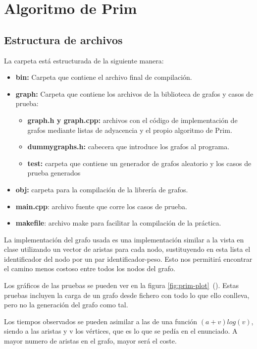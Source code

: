 \section{Algoritmo de Prim}
\subsection{Estructura de archivos}
{
    \small
    La carpeta está estructurada de la siguiente manera:

    \begin{itemize}
        \item\textbf{bin:} Carpeta que contiene el archivo final de compilación.
        \item\textbf{graph:} Carpeta que contiene los archivos de la biblioteca de grafos y casos de prueba:
        \begin{itemize}
            \item\textbf{graph.h y graph.cpp:} archivos con el código de implementación de grafos mediante listas de adyacencia y el propio algoritmo de Prim.
            \item\textbf{dummygraphs.h:} cabecera que introduce los grafos al programa.
            \item\textbf{test:} carpeta que contiene un generador de grafos aleatorio y los casos de prueba generados
        \end{itemize}
        \item\textbf{obj:} carpeta para la compilación de la librería de grafos.
        \item\textbf{main.cpp}: archivo fuente que corre los casos de prueba.
        \item\textbf{makefile}: archivo make para facilitar la compilación de la práctica.
    \end{itemize}

    La implementación del grafo usada es una implementación similar a la vista en clase utilizando un vector de aristas para cada nodo, sustituyendo en esta lista el identificador del nodo por un par identificador-peso.
    Esto nos permitirá encontrar el camino menos costoso entre todos los nodos del grafo.





    Los gráficos de las pruebas se pueden ver en la figura \ref{fig:prim-plot}~(). Estas pruebas incluyen la carga de un grafo desde fichero con todo lo que ello conlleva, pero no la generación del grafo como tal.




    Los tiempos observados se pueden asimilar a las de una función $(a+v)log(v)$, siendo a las aristas y v los vértices, que es lo que se pedía en el enunciado.
    A mayor numero de aristas en el grafo, mayor será el coste.
}
